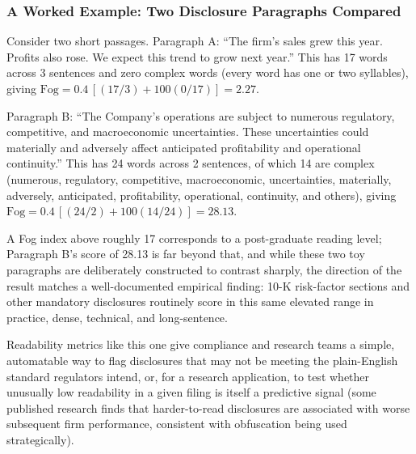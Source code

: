 \documentclass[../ai_in_finance]{subfiles}
\begin{document}
\subsubsection*{A Worked Example: Two Disclosure Paragraphs Compared}

Consider two short passages. Paragraph A: ``The firm's sales grew this year. Profits also rose. We expect this trend to grow next year.'' This has 17 words across 3 sentences and zero complex words (every word has one or two syllables), giving $\text{Fog} = 0.4\,[(17/3) + 100(0/17)] = 2.27$.

Paragraph B: ``The Company's operations are subject to numerous regulatory, competitive, and macroeconomic uncertainties. These uncertainties could materially and adversely affect anticipated profitability and operational continuity.'' This has 24 words across 2 sentences, of which 14 are complex (numerous, regulatory, competitive, macroeconomic, uncertainties, materially, adversely, anticipated, profitability, operational, continuity, and others), giving $\text{Fog} = 0.4\,[(24/2) + 100(14/24)] = 28.13$.

A Fog index above roughly 17 corresponds to a post-graduate reading level; Paragraph B's score of 28.13 is far beyond that, and while these two toy paragraphs are deliberately constructed to contrast sharply, the direction of the result matches a well-documented empirical finding: 10-K risk-factor sections and other mandatory disclosures routinely score in this same elevated range in practice, dense, technical, and long-sentence.

Readability metrics like this one give compliance and research teams a simple, automatable way to flag disclosures that may not be meeting the plain-English standard regulators intend, or, for a research application, to test whether unusually low readability in a given filing is itself a predictive signal (some published research finds that harder-to-read disclosures are associated with worse subsequent firm performance, consistent with obfuscation being used strategically).
\end{document}
